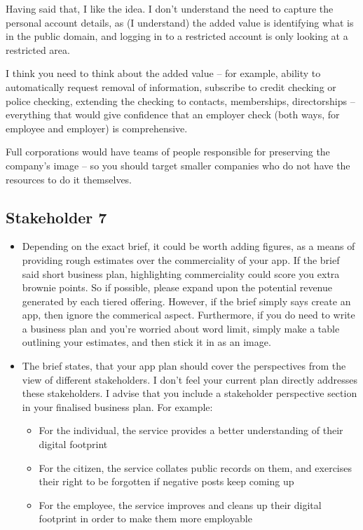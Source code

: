     Having said that, I like the idea.  I don't understand the need to capture the personal account details, as (I understand) the added value is identifying what is in the public domain, and logging in to a restricted account is only looking at a restricted area.

    I think you need to think about the added value – for example, ability to automatically request removal of information, subscribe to credit checking or police checking, extending the checking to contacts, memberships, directorships – everything that would give confidence that an employer check (both ways, for employee and employer) is comprehensive.

    Full corporations would have teams of people responsible for preserving the company's image – so you should target smaller companies who do not have the resources to do it themselves.

  \subsection{Stakeholder 7}

    \begin{itemize}
      \item Depending on the exact brief, it could be worth adding figures, as a means of providing rough estimates over the commerciality of your app. If the brief said short business plan, highlighting commerciality could score you extra brownie points. So if possible, please expand upon the potential revenue generated by each tiered offering. However, if the brief simply says create an app, then ignore the commerical aspect. Furthermore, if you do need to write a business plan and you're worried about word limit, simply make a table outlining your estimates, and then stick it in as an image.
      \item The brief states, that your app plan should cover the perspectives from the view of different stakeholders. I don't feel your current plan directly addresses these stakeholders. I advise that you include a stakeholder perspective section in your finalised business plan. For example:
      \begin{itemize}
        \item For the individual, the service provides a better understanding of their digital footprint
        \item For the citizen, the service collates public records on them, and exercises their right to be forgotten if negative posts keep coming up
        \item For the employee, the service improves and cleans up their digital footprint in order to make them more employable
      \end{itemize}
    \end{itemize}


